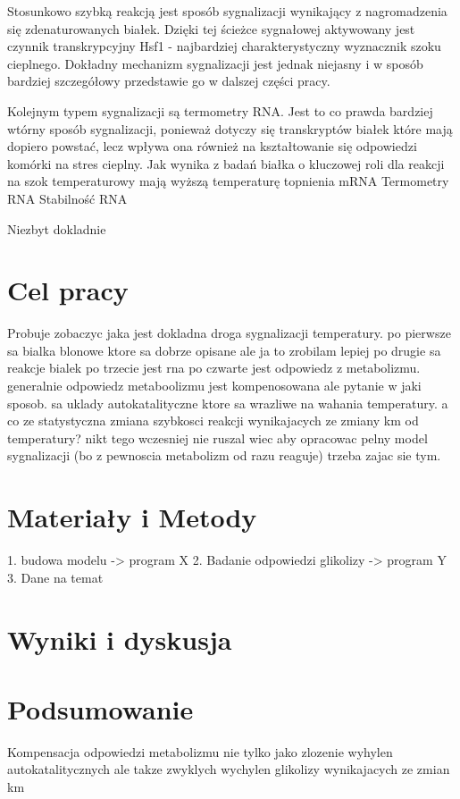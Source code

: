 \documentclass{pracamgr}
\begin{document}
Stosunkowo szybką reakcją jest sposób sygnalizacji wynikający z nagromadzenia się zdenaturowanych białek. Dzięki tej ścieżce
sygnałowej aktywowany jest czynnik transkrypcyjny Hsf1 - najbardziej charakterystyczny wyznacznik szoku cieplnego. Dokładny mechanizm
sygnalizacji jest jednak niejasny i w sposób bardziej szczegółowy przedstawie go w dalszej części pracy.

Kolejnym typem sygnalizacji są termometry RNA. Jest to co prawda bardziej wtórny sposób sygnalizacji, ponieważ dotyczy się
transkryptów białek które mają dopiero powstać, lecz wpływa ona również na kształtowanie się odpowiedzi komórki na stres cieplny.
Jak wynika z badań białka o kluczowej roli dla reakcji na szok temperaturowy mają wyższą temperaturę topnienia mRNA 
Termometry RNA \cite{RNAterm}
Stabilność RNA \cite{Roca11}

Niezbyt dokladnie

 




\chapter{Cel pracy}

Probuje zobaczyc jaka jest dokladna droga sygnalizacji temperatury. po pierwsze sa bialka blonowe ktore sa dobrze opisane ale ja to zrobilam lepiej
po drugie sa reakcje bialek po trzecie jest rna po czwarte jest odpowiedz z metabolizmu. generalnie odpowiedz metaboolizmu jest kompenosowana ale pytanie w jaki sposob.
sa uklady autokatalityczne ktore sa wrazliwe na wahania temperatury. a co ze statystyczna zmiana szybkosci reakcji wynikajacych ze zmiany km od temperatury?
nikt tego wczesniej nie ruszal wiec aby opracowac pelny model sygnalizacji (bo z pewnoscia metabolizm od razu reaguje) trzeba zajac sie tym.

\chapter{Materiały i Metody}

1. budowa modelu
-> program X 
2. Badanie odpowiedzi glikolizy
-> program Y
3. Dane na temat 

\chapter{Wyniki i dyskusja}

\chapter{Podsumowanie}

Kompensacja odpowiedzi metabolizmu nie tylko jako zlozenie wyhylen autokatalitycznych ale takze zwyklych wychylen glikolizy wynikajacych ze zmian km




\end{document}
